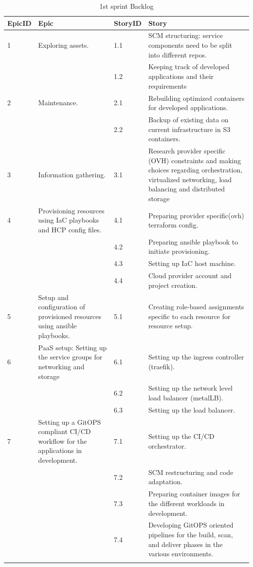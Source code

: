\begin{longtable}[ht]{|m{1.5cm}|m{3cm}|m{1.5cm}|m{8cm}|}
\hline
{\textbf{EpicID}} & {\textbf{Epic}} & {\textbf{StoryID}} & {\textbf{Story}} \\
\hline
1 &  \raggedright Exploring assets.	& 1.1  & SCM structuring: service components need to be split into different repos. \\
\cline{3-4}
& & 1.2 &  	Keeping track of developed applications and their requirements \\
\hline
2  & Maintenance. &	2.1	 &  Rebuilding optimized containers for developed applications. \\
\cline{3-4}
& & 2.2 & Backup of existing data on current infrastructure in S3 containers.\\
\hline
3  & Information gathering.	 &  3.1	 &  Research provider specific (OVH) constraints and making choices regarding orchestration, virtualized networking, load balancing and distributed storage\\
\hline
4  & \raggedright Provisioning resources using IaC playbooks and HCP config files.  &  4.1	 & Preparing provider specific(ovh) terraform config. \\
\cline{3-4}
& & 4.2 & Preparing ansible playbook to initiate provisioning. \\
\cline{3-4}
& & 4.3	& Setting up IaC host machine.  \\
\cline{3-4}
& & 4.4	& Cloud provider account and project creation.  \\
\hline
5  & Setup and configuration of provisioned resources using ansible playbooks.	 &  5.1	 &  Creating role-based assignments specific to each resource for resource setup. \\
\hline
6  & PaaS setup: Setting up the service groups for networking and storage	 &  6.1	 &  Setting up the ingress controller (traefik).\\
\cline{3-4}
& & 6.2 & Setting up the network level load balancer (metalLB). \\
\cline{3-4}
& & 6.3	& Setting up the load balancer. \\
\cline{3-4}
\hline
7  & Setting up a GitOPS compliant CI/CD workflow for the applications in development.  &  7.1	 & Setting up the CI/CD orchestrator.\\
\cline{3-4}
& & 7.2 & SCM restructuring and code adaptation. \\
\cline{3-4}
& & 7.3	& Preparing container images for the different workloads in development.  \\
\cline{3-4}
& & 7.4	& Developing GitOPS oriented pipelines for the build, scan, and deliver phases in the various environments.  \\
\cline{3-4}
\hline
\caption{1st sprint Backlog}
\end{longtable}
\newpage

